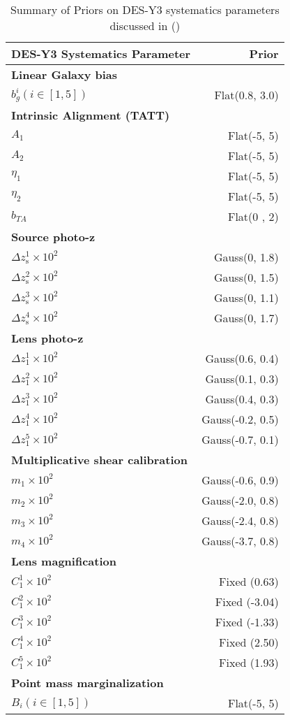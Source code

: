 \begin{table}
\centering
\begin{tabular}{lr} %
\hline
DES-Y3 Systematics Parameter &  Prior \\
\hline\hline
\textbf{Linear Galaxy bias} \\
$ b_g^i(i \in [1,5])$ &  Flat(0.8, 3.0) \\
\hline
\textbf{Intrinsic Alignment (TATT)} \\
$A_{1}$ &  Flat(-5, 5) \\
$A_{2}$ &  Flat(-5, 5) \\
$\eta_{1}$ &  Flat(-5, 5) \\
$\eta_{2}$ &  Flat(-5, 5) \\
$b_{TA}$ &  Flat(0 , 2) \\
\hline
\textbf{Source photo-z} \\
$\Delta z_{\mathrm{s}}^{1} \times 10^{2}$ &   Gauss(0, 1.8) \\
$\Delta z_{\mathrm{s}}^{2} \times 10^{2}$ &   Gauss(0, 1.5) \\
$\Delta z_{\mathrm{s}}^{3} \times 10^{2}$ &   Gauss(0, 1.1)\\
$\Delta z_{\mathrm{s}}^{4} \times 10^{2}$ &   Gauss(0, 1.7)\\
\hline
\textbf{Lens photo-z}\\
$\Delta z_{\mathrm{1}}^{1} \times 10^{2}$ &   Gauss(0.6, 0.4)  \\
$\Delta z_{\mathrm{1}}^{2} \times 10^{2}$ &   Gauss(0.1, 0.3)  \\
$\Delta z_{\mathrm{1}}^{3} \times 10^{2}$ &   Gauss(0.4, 0.3)\\
$\Delta z_{\mathrm{1}}^{4} \times 10^{2}$ &   Gauss(-0.2, 0.5)\\
$\Delta z_{\mathrm{1}}^{5} \times 10^{2}$ &   Gauss(-0.7, 0.1)\\
\hline
\textbf{Multiplicative shear calibration} \\
$m_{1} \times 10^2$ &   Gauss(-0.6, 0.9)\\
$m_{2} \times 10^2$ &   Gauss(-2.0, 0.8)\\
$m_{3} \times 10^2$ &   Gauss(-2.4, 0.8)\\
$m_{4} \times 10^2$ &   Gauss(-3.7, 0.8)\\
\hline
\textbf{Lens magnification} \\
$C_{\mathrm{1}}^1 \times 10^2$ &   Fixed (0.63)\\
$C_{\mathrm{1}}^2 \times 10^2$ &   Fixed (-3.04)\\
$C_{\mathrm{1}}^3 \times 10^2$ &   Fixed (-1.33)\\
$C_{\mathrm{1}}^4 \times 10^2$ &   Fixed (2.50)\\
$C_{\mathrm{1}}^5 \times 10^2$ &   Fixed (1.93)\\
\hline
\textbf{Point mass marginalization} \\
$B_i(i \in [1,5])$  & Flat(-5, 5) \\
\hline
\end{tabular}
\caption{Summary of Priors on DES-Y3 systematics parameters discussed in ()}
\label{table:prior_choices_Y3}
\end{table}
